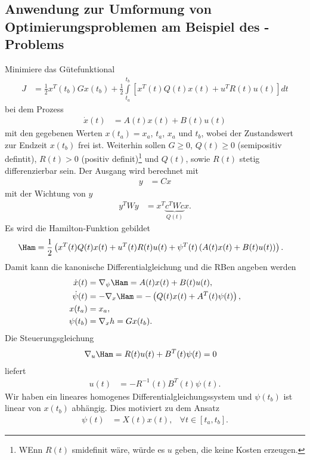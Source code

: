 \subsection{Anwendung zur Umformung von Optimierungsproblemen am Beispiel des -Problems}
Minimiere das Gütefunktional
\begin{align*}
	J  & = \frac12 x^T(t_b)Gx(t_b)+\frac12\int\limits_{t_a}^{t_b}\left[x^T(t)Q(t)x(t)+u^TR(t)u(t)\right]dt
\end{align*}
bei dem Prozess 
\begin{align*}
	\dot{x}(t) & = A(t)x(t)+B(t)u(t)
\end{align*}
mit den gegebenen Werten $x(t_a)=x_a$, $t_a$, $x_a$ und $t_b$, wobei der Zustandswert zur Endzeit $x(t_b)$ frei ist. Weiterhin sollen $G\ge 0$,
$Q(t)\ge 0$ (semipositiv defintit), $R(t)>0$ (positiv definit)\footnote{WEnn $R(t)$ smidefinit wäre, würde es $u$ geben, die keine Kosten erzeugen.}
und $Q(t)$, sowie $R(t)$ stetig differenzierbar sein. Der Ausgang wird berechnet mit
\begin{align*}
	y & = C x
\end{align*}
mit der Wichtung von $y$
\begin{align*}
	y^T W y & = x^T\underbrace{c^TWc}_{Q(t)}x.
\end{align*}
Es wird die Hamilton-Funktion gebildet
\begin{align*}
	\Ham & = \frac12\left(x^T(t) Q(t)x(t)+u^T(t)R(t)u(t)+\psi^T(t)\left(A(t)x(t)+B(t)u(t) \right) \right).
\end{align*}
Damit kann die kanonische Differentialgleichung und die \ac{RB}en angeben werden
\begin{align*}
	\dot{x}(t) & = \nabla_{\psi}\Ham = A(t)x(t)+B(t)u(t),\\
	\dot{\psi}(t) & = -\nabla_x\Ham = -\left(Q(t)x(t) + A^T(t)\psi(t) \right),\\
	x(t_a) & = x_a, \\
	\psi(t_b) & = \nabla_x h=G x(t_b).
\end{align*}
Die Steuerungsgleichung 
\begin{align*}
	\nabla_u\Ham & = R(t) u(t) + B^T(t)\psi(t)=0
\end{align*}
liefert
\begin{align*}
	u(t) & = -R^{-1}(t)B^T(t)\psi(t).
\end{align*}
Wir haben ein lineares homogenes Differentialgleichungssystem und $\psi(t_b)$ ist linear von $x(t_b)$ abhängig. Dies motiviert zu dem Ansatz
\begin{align*}
	\psi(t) & = X(t)x(t), & \forall t\in[t_a,t_b].
\end{align*}
